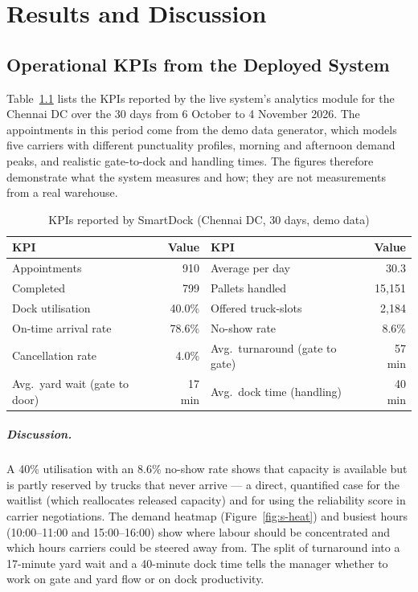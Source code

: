 \chapter{Results and Discussion}

\section{Operational KPIs from the Deployed System}
Table~\ref{tab:kpis} lists the KPIs reported by the live system's analytics module for the Chennai DC over the 30 days from 6 October to 4 November 2026. The appointments in this period come from the demo data generator, which models five carriers with different punctuality profiles, morning and afternoon demand peaks, and realistic gate-to-dock and handling times. The figures therefore demonstrate what the system measures and how; they are not measurements from a real warehouse.

\begin{table}[H]
\centering
\caption{KPIs reported by SmartDock (Chennai DC, 30 days, demo data)}
\label{tab:kpis}
\begin{tabular}{lr@{\hspace{2.5em}}lr}
\toprule
\textbf{KPI} & \textbf{Value} & \textbf{KPI} & \textbf{Value}\\
\midrule
Appointments & 910 & Average per day & 30.3 \\
Completed & 799 & Pallets handled & 15{,}151 \\
Dock utilisation & 40.0\% & Offered truck-slots & 2{,}184 \\
On-time arrival rate & 78.6\% & No-show rate & 8.6\% \\
Cancellation rate & 4.0\% & Avg.\ turnaround (gate to gate) & 57 min \\
Avg.\ yard wait (gate to door) & 17 min & Avg.\ dock time (handling) & 40 min \\
\bottomrule
\end{tabular}
\end{table}

\paragraph{Discussion.} A 40\% utilisation with an 8.6\% no-show rate shows that capacity is available but is partly reserved by trucks that never arrive --- a direct, quantified case for the waitlist (which reallocates released capacity) and for using the reliability score in carrier negotiations. The demand heatmap (Figure~\ref{fig:s-heat}) and busiest hours (10:00--11:00 and 15:00--16:00) show where labour should be concentrated and which hours carriers could be steered away from. The split of turnaround into a 17-minute yard wait and a 40-minute dock time tells the manager whether to work on gate and yard flow or on dock productivity.


